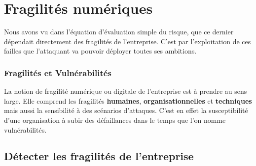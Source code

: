 
\section{Fragilités numériques}

Nous avons vu dans l'équation d'évaluation simple du risque, que ce dernier dépendait directement des fragilités de l'entreprise. C'est par l'exploitation de ces failles que l'attaquant va pouvoir déployer toutes ses ambitions.

\begin{frame}
\frametitle<presentation>{Fragilités et Vulnérabilités}
La notion de fragilité numérique ou digitale de l'entreprise est à prendre au sens large. Elle comprend les fragilités \textbf{humaines}, \textbf{organisationnelles} et \textbf{techniques} mais aussi la sensibilité à des scénarios d'attaques. C'est en effet la susceptibilité d’une organisation à subir des défaillances dans le temps que l'on nomme vulnérabilités.
\end{frame}

\subsection{Détecter les fragilités de l’entreprise}

